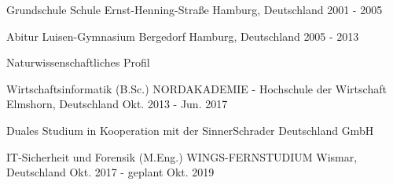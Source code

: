

\begin{cventries}

  \cventry
    {Grundschule} %
    {Schule Ernst-Henning-Straße} %
    {Hamburg, Deutschland} %
    {2001 - 2005} %
    {}

  \cventry
    {Abitur} %
    {Luisen-Gymnasium Bergedorf} %
    {Hamburg, Deutschland} %
    {2005 - 2013} %
    {
      \begin{cvitems} %
        \item {Naturwissenschaftliches Profil}
      \end{cvitems}
    }

  \cventry
    {Wirtschaftsinformatik (B.Sc.)} %
    {NORDAKADEMIE - Hochschule der Wirtschaft} %
    {Elmshorn, Deutschland} %
    {Okt. 2013 - Jun. 2017} %
    {
      \begin{cvitems} %
        \item {Duales Studium in Kooperation mit der SinnerSchrader Deutschland GmbH}
      \end{cvitems}
    }

  \cventry
    {IT-Sicherheit und Forensik (M.Eng.)} %
    {WINGS-FERNSTUDIUM} %
    {Wismar, Deutschland} %
    {Okt. 2017 - geplant Okt. 2019} %
    {}

\end{cventries}
